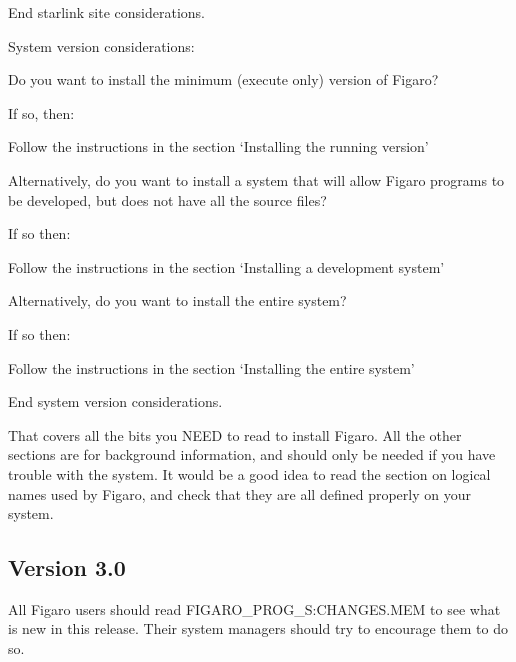 End starlink site considerations.

System version considerations:
\begin{description}
	\item Do you want to install the minimum (execute only) version of 
Figaro?
	\begin{description}          
		\item If so, then:
		\begin{description}
			\item Follow the instructions in the section 
`Installing the running version'
		\end{description}
	\end{description}
	\item Alternatively, do you want to install a system that will allow 
Figaro programs to be developed, but does not have all the source files?
	\begin{description}
		\item If so then:
		\begin{description}
			\item Follow the instructions in the section 
`Installing a development system'
		\end{description}
	\end{description}
	\item Alternatively, do you want to install the entire system?
	\begin{description}
		\item If so then:
		\begin{description}
			\item Follow the instructions in the section 
`Installing the entire system'
		\end{description}
	\end{description}
\end{description}
End system version considerations.

That covers all the bits you NEED to read to install Figaro. All the other
sections are for background information, and should only be needed if you have
trouble with the system. It would be a good idea to read the section on
logical names used by Figaro, and check that they are all defined properly on
your system. 

\subsection{Version 3.0} 

All Figaro users should 
read FIGARO\_PROG\_S:CHANGES.MEM to see what is new in this release. 
Their system managers should try to encourage them to do so.

